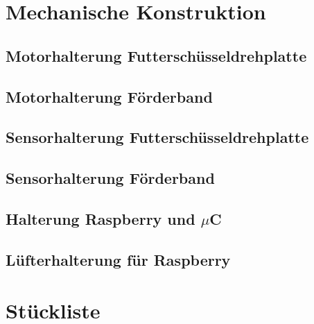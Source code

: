 \section{Mechanische Konstruktion}
\subsection{Motorhalterung Futterschüsseldrehplatte}
\subsection{Motorhalterung Förderband}
\subsection{Sensorhalterung Futterschüsseldrehplatte}
\subsection{Sensorhalterung Förderband}
\subsection{Halterung Raspberry und $\mu$C}
\subsection{Lüfterhalterung für Raspberry}
\newpage
\section{Stückliste}

